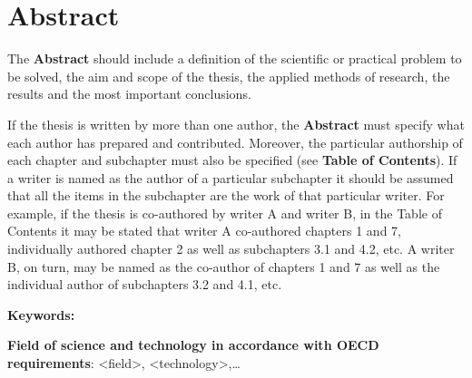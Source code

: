 \chapter*{Abstract}

The \textbf{Abstract} should include a definition of the scientific or practical problem to be solved, the aim and scope of the thesis, the applied methods of research, the results and the most important conclusions.

If the thesis is written by more than one author, the \textbf{Abstract} must specify what each author has prepared and contributed. Moreover, the particular authorship of each chapter and subchapter must also be specified (see \textbf{Table of Contents}). If a writer is named as the author of a particular subchapter it should be assumed that all the items in the subchapter are the work of that particular writer. For example, if the thesis is co-authored by writer A and writer B, in the Table of Contents it may be stated that writer A co-authored chapters 1 and 7, individually authored chapter 2 as well as subchapters 3.1 and 4.2, etc. A writer B, on turn, may be named as the co-author of chapters 1 and 7 as well as the individual author of subchapters 3.2 and 4.1, etc.

\vspace{12pt}
\noindent\textbf{Keywords:}

\vspace{12pt}
\noindent\textbf{Field of science and technology in accordance with OECD requirements}: \textless{}field\textgreater{}, \textless{}technology\textgreater{},\ldots